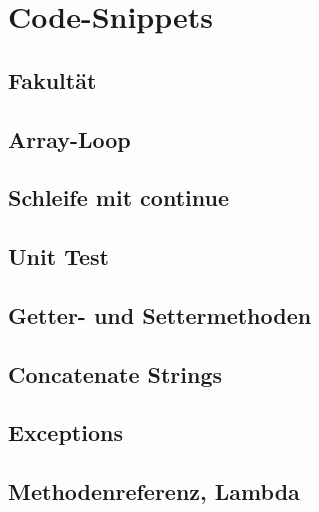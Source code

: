 \section{Code-Snippets}

\subsection{Fakultät}
    

\subsection{Array-Loop}{\label{Array-Loop}}
    

\subsection{Schleife mit continue}
    

\subsection{Unit Test}{\label{Unit-Test}}
    

\subsection{Getter- und Settermethoden}{\label{GetSet}}
    

\subsection{Concatenate Strings}
    

\subsection{Exceptions}
    

\subsection{Methodenreferenz, Lambda}\label{Lambdas}
    